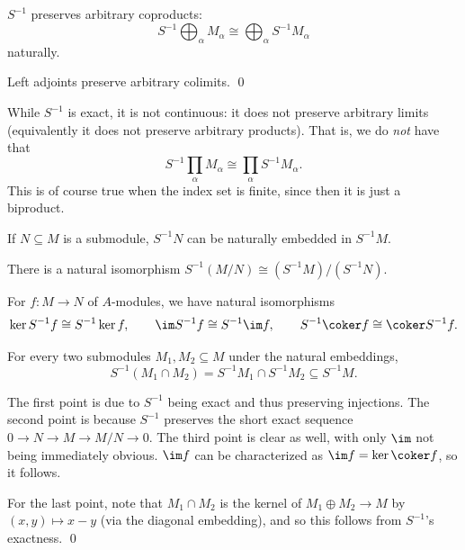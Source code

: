 \bcoro

    $S^{-1}$ preserves arbitrary coproducts:
    $$ S^{-1}\bigoplus_\alpha M_\alpha \cong \bigoplus_\alpha S^{-1}M_\alpha $$
    naturally.

\ecoro

\bproof

    Left adjoints preserve arbitrary colimits.
    \qed

\eproof

\bnote

    While $S^{-1}$ is exact, it is not {\emphcolor continuous}: it does not preserve arbitrary limits (equivalently it does not preserve
    arbitrary products).
    That is, we do {\it not\/} have that
    $$ S^{-1}\prod_\alpha M_\alpha \cong \prod_\alpha S^{-1}M_\alpha . $$
    This is of course true when the index set is finite, since then it is just a biproduct.

\enote

\bcoro

    \benum
        \item If $N\subseteq M$ is a submodule, $S^{-1}N$ can be naturally embedded in $S^{-1}M$.
        \item There is a natural isomorphism $S^{-1}(M/N)\cong (S^{-1}M)/(S^{-1}N)$.
        \item For $f\colon M\to N$ of $A$-modules, we have natural isomorphisms
        $$ \ker S^{-1}f \cong S^{-1}\ker f,\qquad \im S^{-1}f \cong S^{-1}\im f,\qquad S^{-1}\coker f\cong\coker S^{-1}f . $$
        \item For every two submodules $M_1,M_2\subseteq M$ under the natural embeddings,
        $$ S^{-1}(M_1\cap M_2) = S^{-1}M_1\cap S^{-1}M_2 \subseteq S^{-1}M . $$
    \eenum

\ecoro

\bproof

    The first point is due to $S^{-1}$ being exact and thus preserving injections.
    The second point is because $S^{-1}$ preserves the short exact sequence $0\to N\to M\to M/N\to0$.
    The third point is clear as well, with only $\im$ not being immediately obvious.
    $\im f$ can be characterized as $\im f=\ker\coker f$, so it follows.

    For the last point, note that $M_1\cap M_2$ is the kernel of $M_1\oplus M_2\to M$ by $(x,y)\mapsto x-y$
    (via the diagonal embedding), and so this follows from $S^{-1}$'s exactness.
    \qed

\eproof

\bdefn


